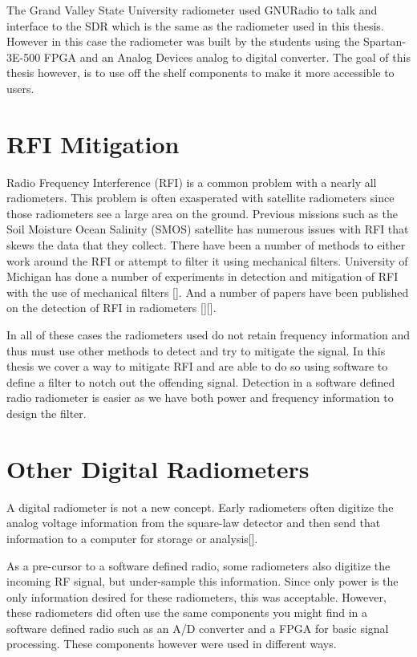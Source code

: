 The Grand Valley State University radiometer used GNURadio to talk and interface to the SDR which is the same as the radiometer used in this thesis.  However in this case the radiometer was built by the students using the Spartan-3E-500 FPGA and an Analog Devices analog to digital converter.  The goal of this thesis however, is to use off the shelf components to make it more accessible to users.  

\section{RFI Mitigation}
Radio Frequency Interference (RFI) is a common problem with a nearly all radiometers.  This problem is often exasperated with satellite radiometers since those radiometers see a large area on the ground.  Previous missions such as the Soil Moisture Ocean Salinity (SMOS) satellite has numerous issues with RFI that skews the data that they collect.  There have been a number of methods to either work around the RFI or attempt to filter it using mechanical filters.  University of Michigan has done a number of experiments in detection and mitigation of RFI with the use of mechanical filters [\cite{DeRooRFI}].  And a number of papers have been published on the detection of RFI in radiometers [\citep{DeRoo}][\cite{Forte}].

In all of these cases the radiometers used do not retain frequency information and thus must use other methods to detect and try to mitigate the signal.  In this thesis we cover a way to mitigate RFI and are able to do so using software to define a filter to notch out the offending signal.  Detection in a software defined radio radiometer is easier as we have both power and frequency information to design the filter.

\section{Other Digital Radiometers}
A digital radiometer is not a new concept.  Early radiometers often digitize the analog voltage information from the square-law detector and then send that information to a computer for storage or analysis[\cite{Ruf}].  

As a pre-cursor to a software defined radio, some radiometers also digitize the incoming RF signal, but under-sample this information.  Since only power is the only information desired for these radiometers, this was acceptable.  However, these radiometers did often use the same components you might find in a software defined radio such as an A/D converter and a FPGA for basic signal processing.  These components however were used in different ways.


